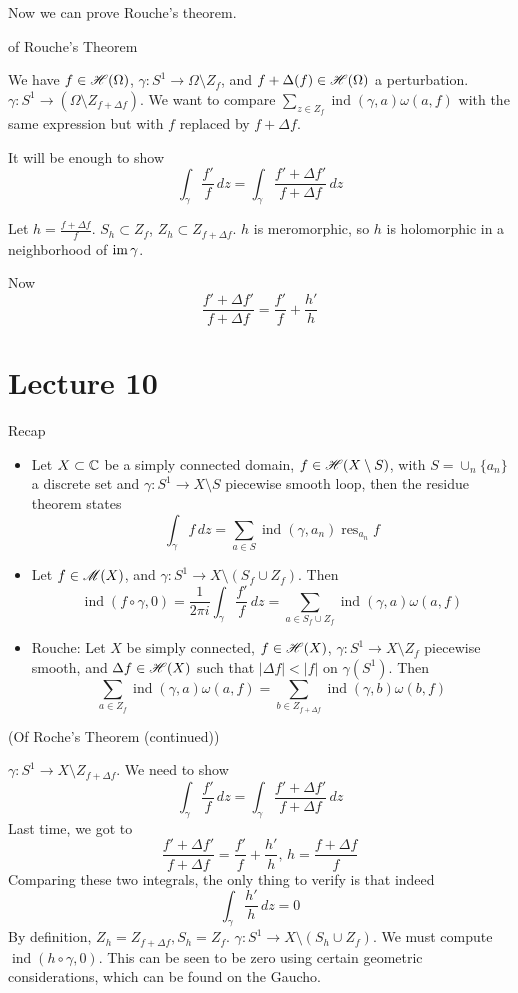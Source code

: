 \documentclass[x11names,reqno,14pt]{extarticle}
\DeclareMathOperator{\ind}{ind}
\DeclareMathOperator{\res}{res}
\begin{document}
Now we can prove Rouche's theorem. 

\proof of Rouche's Theorem

We have $f \in \mathscr{H}(\Omega)$, $\gamma:S^1\to\Omega\setminus Z_f$, and $f + \Delta(f) \in \mathscr{H}(\Omega)$ a perturbation. $\gamma:S^1\to(\Omega\setminus Z_{f + \Delta f})$. We want to compare $\sum_{z\in Z_f}\ind(\gamma, a)\omega(a, f)$ with the same expression but with $f$ replaced by $f + \Delta f$. 

It will be enough to show
\[
\int_{\gamma}\frac{f'}{f}\,dz = \int_{\gamma}\frac{f' + \Delta f'}{f + \Delta f}\,dz
\]

Let $h = \frac{f + \Delta f}{f}$. $S_h \subset Z_f$, $Z_h \subset Z_{f + \Delta f}$. $h$ is meromorphic, so $h$ is holomorphic in a neighborhood of $\operatorname{\mathrm{im}}\gamma$. 

Now
\[
\frac{f' + \Delta f'}{f + \Delta f} = \frac{f'}{f} + \frac{h'}{h}
\]

\section*{Lecture 10}

Recap

\begin{itemize}
\item Let $X\subset\mathbb{C}$ be a simply connected domain, $f\in\mathscr{H}(X\setminus S)$, with $S = \cup_n \{a_n\}$ a discrete set and $\gamma:S^1\to X\setminus S$ piecewise smooth loop, then the residue theorem states
\[
\int_\gamma f\,dz = \sum_{a\in S}\operatorname{ind}(\gamma, a_n)\res_{a_n}f
\]

\item Let $f\in \mathscr{M}(X)$, and $\gamma:S^1\to X\setminus(S_f \cup Z_f)$. Then 
\[
\operatorname{ind}(f\circ \gamma, 0) = \frac{1}{2\pi i}\int_{\gamma}\frac{f'}{f}\,dz = \sum_{a\in S_f \cup Z_f}\operatorname{ind}(\gamma, a)\omega(a, f)
\]
\item Rouche: Let $X$ be simply connected, $f\in \mathscr{H}(X)$, $\gamma:S^1\to X\setminus Z_f$ piecewise smooth, and $\Delta f \in \mathscr{H}(X)$ such that $|\Delta f|<|f|$ on $\gamma(S^1)$. Then
\[
\sum_{a\in Z_f}\ind(\gamma, a)\omega(a, f) = \sum_{b\in Z_{f + \Delta f}}\ind(\gamma, b)\omega(b, f)
\]
\end{itemize}

\proof (Of Roche's Theorem (continued))

$\gamma:S^1\to X\setminus Z_{f + \Delta f}$. We need to show 
\[
\int_{\gamma}\frac{f'}{f}\,dz = \int_{\gamma}\frac{f' + \Delta f'}{f + \Delta f}\,dz
\]
Last time, we got to
\[
\frac{f' + \Delta f'}{f + \Delta f} = \frac{f'}{f} + \frac{h'}{h},\, h = \frac{f + \Delta f}{f}
\]
Comparing these two integrals, the only thing to verify is that indeed
\[
\int_{\gamma}\frac{h'}{h}\,dz = 0
\]
By definition, $Z_h = Z_{f + \Delta f}, S_h = Z_f$. $\gamma:S^1\to X\setminus(S_h \cup Z_f)$. We must compute $\ind(h\circ\gamma,0)$. This can be seen to be zero using certain geometric considerations, which can be found on the Gaucho. 
\end{document}
